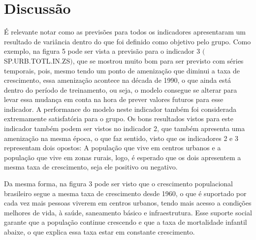 \section{Discussão}

É relevante notar como as previsões para todos os indicadores apresentaram um resultado de 
variância dentro do que foi definido como objetivo pelo grupo. Como exemplo, na figura 5 
pode ser vista a previsão para o indicador 3 $($SP.URB.TOTL.IN.ZS$)$, que se mostrou muito bom 
para ser previsto com séries temporais, pois, mesmo tendo um ponto de amenização que diminui 
a taxa de crescimento, essa amenização acontece na década de 1990, o que ainda está dentro 
do período de treinamento, ou seja, o modelo consegue se alterar para levar essa mudança em 
conta na hora de prever valores futuros para esse indicador. A performance do modelo neste 
indicador também foi considerada extremamente satisfatória para o grupo. Os bons resultados 
vistos para este indicador também podem ser vistos no indicador 2, que também apresenta uma 
amenização na mesma época, o que faz sentido, visto que os indicadores 2 e 3 representam dois 
opostos: A população que vive em centros urbanos e a população que vive em zonas rurais, logo, 
é esperado que os dois apresentem a mesma taxa de crescimento, seja ele positivo ou negativo.


Da mesma forma, na figura 3 pode ser visto que o crescimento populacional brasileiro segue a 
mesma taxa de crescimento desde 1960, o que é suportado por cada vez mais pessoas viverem 
em centros urbanos, tendo mais acesso a condições melhores de vida, à saúde, saneamento básico 
e infraestrutura. Esse suporte social garante que a população continue crescendo e que a 
taxa de mortalidade infantil abaixe, o que explica essa taxa estar em constante crescimento. 
